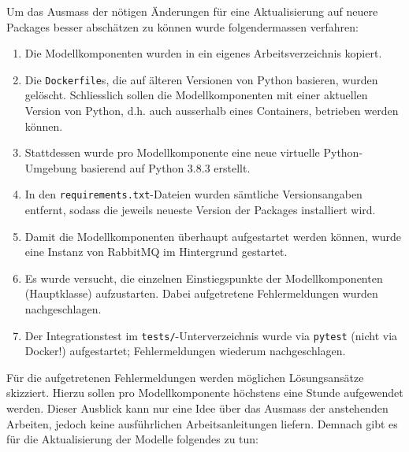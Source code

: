 Um das Ausmass der nötigen Änderungen für eine Aktualisierung auf neuere Packages besser abschätzen zu können wurde folgendermassen verfahren:

\begin{enumerate}
    \item Die Modellkomponenten wurden in ein eigenes Arbeitsverzeichnis kopiert.
    \item Die \texttt{Dockerfile}s, die auf älteren Versionen von Python basieren, wurden gelöscht. Schliesslich sollen die Modellkomponenten mit einer aktuellen Version von Python, d.h. auch ausserhalb eines Containers, betrieben werden können.
    \item Stattdessen wurde pro Modellkomponente eine neue virtuelle Python-Umgebung basierend auf Python 3.8.3 erstellt.
    \item In den \texttt{requirements.txt}-Dateien wurden sämtliche Versionsangaben entfernt, sodass die jeweils neueste Version der Packages installiert wird.
    \item Damit die Modellkomponenten überhaupt aufgestartet werden können, wurde eine Instanz von RabbitMQ im Hintergrund gestartet.
    \item Es wurde versucht, die einzelnen Einstiegspunkte der Modellkomponenten (Hauptklasse) aufzustarten. Dabei aufgetretene Fehlermeldungen wurden nachgeschlagen.
    \item Der Integrationstest im \texttt{tests/}-Unterverzeichnis wurde via \texttt{pytest} (nicht via Docker!) aufgestartet; Fehlermeldungen wiederum nachgeschlagen.
\end{enumerate}

Für die aufgetretenen Fehlermeldungen werden möglichen Lösungsansätze skizziert. Hierzu sollen pro Modellkomponente höchstens eine Stunde aufgewendet werden. Dieser Ausblick kann nur eine Idee über das Ausmass der anstehenden Arbeiten, jedoch keine ausführlichen Arbeitsanleitungen liefern. Demnach gibt es für die Aktualisierung der Modelle folgendes zu tun:

